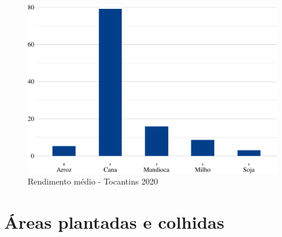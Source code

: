 \begin{figure}[h]
	\caption{Rendimento médio - Tocantins 2020}
	\includegraphics{fig/rendim_medio-1.pdf}
\end{figure}

\section{Áreas plantadas e colhidas}

